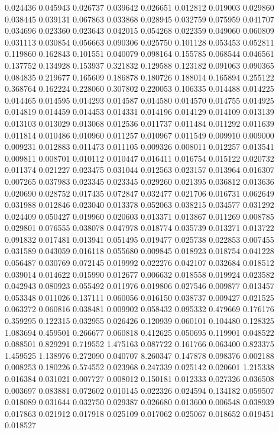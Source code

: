 0.024436
0.045943
0.026737
0.039642
0.026651
0.012812
0.019003
0.029860
0.038445
0.039131
0.067863
0.033868
0.028945
0.032759
0.075959
0.041707
0.034696
0.023360
0.023643
0.042015
0.054268
0.022359
0.049060
0.060809
0.031113
0.030854
0.056663
0.090306
0.025750
0.101128
0.053453
0.052811
0.119860
0.162843
0.101551
0.040079
0.098164
0.155785
0.068544
0.046561
0.137752
0.134928
0.153937
0.321832
0.129588
0.123182
0.091063
0.090365
0.084835
0.219677
0.165609
0.186878
0.180726
0.188014
0.165894
0.255122
0.368764
0.162224
0.228060
0.307802
0.220053
0.106335
0.014488
0.014225
0.014465
0.014595
0.014293
0.014587
0.014580
0.014570
0.014755
0.014925
0.014819
0.014459
0.014453
0.014331
0.014196
0.014129
0.014109
0.013139
0.013103
0.013029
0.013068
0.012536
0.011737
0.011484
0.011292
0.011639
0.011814
0.010486
0.010960
0.011257
0.010967
0.011549
0.009910
0.009000
0.009231
0.012883
0.011473
0.011105
0.009326
0.008011
0.012257
0.013541
0.009811
0.008701
0.010112
0.010447
0.016411
0.016754
0.015122
0.020732
0.011374
0.021227
0.023475
0.031044
0.012563
0.023157
0.013964
0.016307
0.007265
0.037983
0.023345
0.023345
0.029260
0.021395
0.036812
0.013636
0.020690
0.028752
0.017435
0.072847
0.032477
0.021706
0.016731
0.062649
0.031988
0.012846
0.023040
0.013378
0.052063
0.038215
0.034577
0.031292
0.024409
0.050427
0.019960
0.020603
0.013371
0.013867
0.011269
0.008785
0.029801
0.076555
0.038078
0.047978
0.018774
0.035739
0.013271
0.013722
0.091832
0.017481
0.013941
0.051495
0.019477
0.025738
0.022853
0.007455
0.031589
0.043059
0.016118
0.055680
0.009845
0.018923
0.018754
0.041228
0.056487
0.030769
0.072145
0.019992
0.022276
0.042107
0.032684
0.018512
0.039014
0.014622
0.015990
0.012677
0.006632
0.018558
0.019924
0.023582
0.042943
0.080923
0.055492
0.011976
0.019806
0.027546
0.009877
0.013457
0.053348
0.011026
0.137111
0.060056
0.016150
0.038737
0.009427
0.021525
0.063272
0.060816
0.038481
0.009902
0.058432
0.095332
0.479669
0.176176
0.359295
0.122315
0.032955
0.026426
0.120939
0.060101
0.104480
0.128325
1.083694
0.459501
0.266677
0.060818
0.412625
0.050695
0.119901
0.048522
0.088501
0.829291
0.719552
1.475163
0.087722
0.161766
0.063400
0.823375
1.459525
1.138976
0.272090
0.040707
8.260347
0.147878
0.098376
0.002188
0.008253
0.180226
0.574552
0.023968
0.247339
0.025142
0.020601
1.215338
0.016384
0.031021
0.007727
0.008012
0.150181
0.012333
0.027326
0.036508
0.003697
0.083881
0.072602
0.010145
0.022326
0.024594
0.134182
0.059507
0.018089
0.031644
0.032750
0.029387
0.026680
0.013600
0.006548
0.038939
0.017863
0.021912
0.017918
0.025109
0.017062
0.025067
0.018652
0.019451
0.018527

